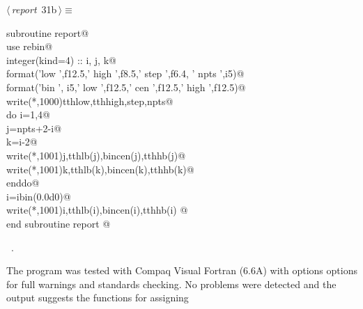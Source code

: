 \documentclass[10pt,a4paper,notitlepage]{article}
\begin{document}
\begin{flushleft} \small
\begin{minipage}{\linewidth}\label{scrap36}\raggedright\small
{} $\langle\,${\it report}\nobreak\ {\footnotesize {31b}}$\,\rangle\equiv$
\vspace{-1ex}
\begin{list}{}{} \item
\mbox{}\verb@      subroutine report@\\
\mbox{}\verb@      use rebin@\\
\mbox{}\verb@      integer(kind=4) :: i, j, k@\\
\mbox{}  format('low ',f12.5,' high ',f8.5,' step ',f6.4, ' npts ',i5)@\\
\mbox{}  format('bin ', i5,' low ',f12.5,' cen ',f12.5,' high ',f12.5)@\\
\mbox{}\verb@      write(*,1000)tthlow,tthhigh,step,npts@\\
\mbox{}\verb@      do i=1,4@\\
\mbox{}\verb@        j=npts+2-i@\\
\mbox{}\verb@        k=i-2@\\
\mbox{}\verb@        write(*,1001)j,tthlb(j),bincen(j),tthhb(j)@\\
\mbox{}\verb@        write(*,1001)k,tthlb(k),bincen(k),tthhb(k)@\\
\mbox{}\verb@      enddo@\\
\mbox{}\verb@      i=ibin(0.0d0)@\\
\mbox{}\verb@      write(*,1001)i,tthlb(i),bincen(i),tthhb(i)      @\\
\mbox{}\verb@      end subroutine report                                                  @{\NWsep}
\end{list}
\vspace{-1.5ex}
\footnotesize
\begin{list}{}{\setlength{\itemsep}{-\parsep}\setlength{\itemindent}{-\leftmargin}}
\item \NWtxtMacroRefIn\ .

\item{}
\end{list}
\end{minipage}\vspace{4ex}
\end{flushleft}
The program was tested with Compaq Visual Fortran (6.6A) with options options 
for full warnings and standards checking. 
No problems were detected and the output suggests the functions for assigning 
\end{document}
